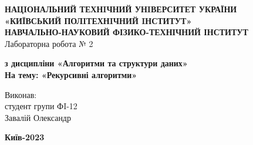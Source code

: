 \documentclass[a4paper,12pt]{article}
\begin{document}
    \begin{center}
        \hfill \break
        \large{\textbf{НАЦIОНАЛЬНИЙ ТЕХНIЧНИЙ УНIВЕРСИТЕТ УКРАЇНИ\\
                «КИЇВСЬКИЙ ПОЛIТЕХНIЧНИЙ IНСТИТУТ»\\
                НАВЧАЛЬНО-НАУКОВИЙ ФІЗИКО-ТЕХНІЧНИЙ ІНСТИТУТ}}\\
        \hfill \break \hfill \break \hfill\break \hfill \break \hfill \break \hfill \break \hfill \break
        \hfill \break \hfill \break \hfill \break \hfill \break
        \large{Лабораторна робота № 2}
        \begin{center}
            \normalsize{\textbf{з дисципліни «Алгоритми та структури даних» \\
            На тему: «Рекурсивні алгоритми» \\}}
        \end{center}
    \end{center}
    \hfill \break \hfill \break \hfill \break \hfill \break \hfill \break \hfill \break \hfill \break
    \hfill \break \hfill \break \hfill \break \hfill \break \hfill \break \hfill \break 
    \begin{flushright}
        \large{ \hspace{35pt} Виконав:\\
            студент групи ФI-12\\
            Завалій Олександр} 
    \end{flushright}
    \hfill \break \hfill \break \hfill \break \hfill \break \hfill \break \hfill \break \hfill \break
    \hfill \break
    \begin{center} \textbf{Київ-2023} \end{center}
    \thispagestyle{empty}
\end{document}
